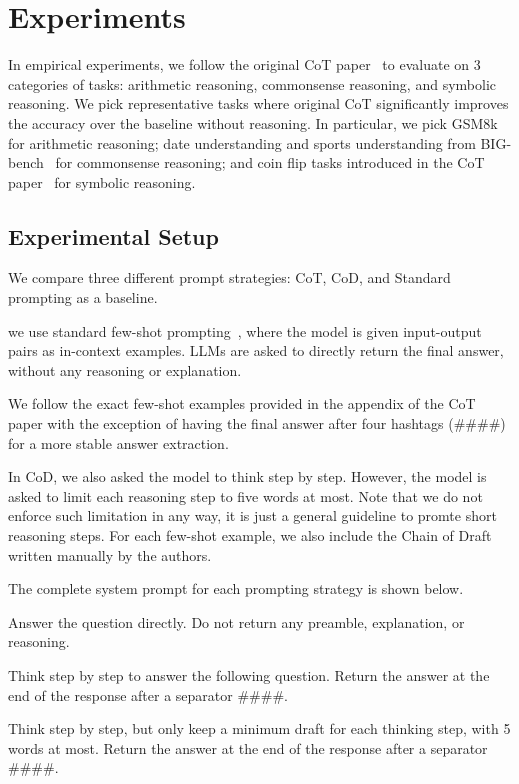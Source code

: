 \section{Experiments}
In empirical experiments, we follow the original CoT paper~\cite{cot} to evaluate on 3 categories of tasks: arithmetic reasoning, commonsense reasoning, and symbolic reasoning. 
We pick representative tasks where original CoT significantly improves the accuracy over the baseline without reasoning. In particular, we pick GSM8k~\cite{gsm8k} for arithmetic reasoning; date understanding and sports understanding from BIG-bench~\cite{bigbench} for commonsense reasoning; and coin flip tasks introduced in the CoT paper~\cite{cot} for symbolic reasoning. 

\subsection{Experimental Setup}
We compare three different prompt strategies: CoT, CoD, and Standard prompting as a baseline.

 we use standard few-shot prompting~\cite{fewshot}, where the model is given input-output pairs as in-context examples. LLMs are asked to directly return the final answer, without any reasoning or explanation. 

We follow the exact few-shot examples provided in the appendix of the CoT paper with the exception of having the final answer after four hashtags ({\small \#\#\#\#}) for a more stable answer extraction. 

 In CoD, we also asked the model to think step by step. However, the model is asked to limit each reasoning step to five words at most. Note that we do not enforce such limitation in any way, it is just a general guideline to promte short reasoning steps. 
For each few-shot example, we also include the Chain of Draft written manually by the authors. 

The complete system prompt for each prompting strategy is shown below.

\begin{center}
\centering
\begin{promptbox}[Standard]
Answer the question directly.
Do not return any preamble, explanation, or reasoning.
\end{promptbox}
\begin{promptbox}
Think step by step to answer the following question.
Return the answer at the end of the response after a separator \#\#\#\#.
\end{promptbox}
\begin{promptbox}
Think step by step, but only keep a minimum draft for each thinking step, with 5 words at most.
Return the answer at the end of the response after a separator \#\#\#\#.
\end{promptbox}
\end{center}

